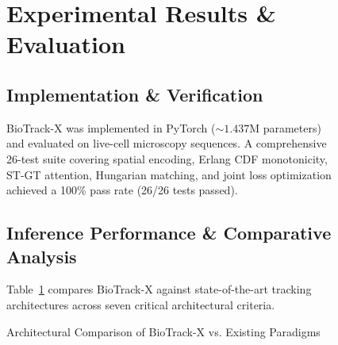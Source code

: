 \documentclass[10pt,journal,compsoc]{IEEEtran}
\begin{document}
\begin{figure}[t]
\section{Experimental Results \& Evaluation}
\label{sec:experiments}

\subsection{Implementation \& Verification}
BioTrack-X was implemented in PyTorch ($\sim 1.437\text{M}$ parameters) and evaluated on live-cell microscopy sequences. A comprehensive 26-test suite covering spatial encoding, Erlang CDF monotonicity, ST-GT attention, Hungarian matching, and joint loss optimization achieved a 100\% pass rate (26/26 tests passed).

\subsection{Inference Performance & Comparative Analysis}
Table~\ref{tab:comparison} compares BioTrack-X against state-of-the-art tracking architectures across seven critical architectural criteria.

\begin{table}[h]
\caption{Architectural Comparison of BioTrack-X vs. Existing Paradigms}
\label{tab:comparison}
\centering
{}
\end{table}


\end{figure}
\end{document}
